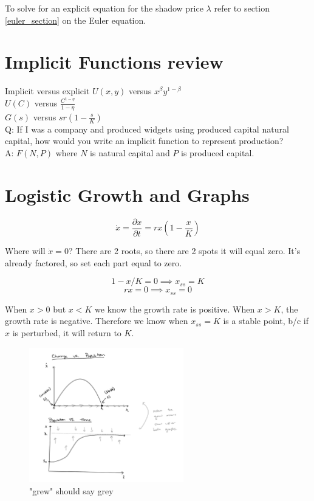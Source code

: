 \documentclass[12pt]{article}
\begin{document}
To solve for an explicit equation for the shadow price $\lambda$ refer to section \ref{euler_section} on the Euler equation.

\section{Implicit Functions review}
Implicit versus explicit 
$U(x,y)$ versus $x^{\beta}y^{1-\beta}$\\
$U(C)$ versus $\frac{C^{1 - \eta}}{1 - \eta}$\\
$G(s)$ versus $sr(1 - \frac{s}{K})$\\

Q: If I was a company and produced widgets using produced capital natural capital, how would you write an implicit function to represent production? \\
A: $F(N, P)$ where $N$ is natural capital and $P$ is produced capital. 

\section{Logistic Growth and Graphs}
$$ \dot x = \frac{\partial x}{\partial t} = rx(1 - \frac{x}{K})$$

Where will $\dot x = 0$? There are 2 roots, so there are 2 spots it will equal zero. It's already factored, so set each part equal to zero. 

$$ 1 - x/K = 0 \implies x_{ss} = K$$
$$ rx = 0 \implies x_{ss} = 0$$

When $x > 0$ but $ x < K$ we know the growth rate is positive. When $x > K$, the growth rate is negative. Therefore we know when $x_{ss} = K$ is a stable point, b/c if $x$ is perturbed, it will return to $K$. 

\begin{figure}[h]
    \centering
    \includegraphics[width=0.6\textwidth]{logistic_growth.png}
    \caption{"grew" should say grey}
    \label{fig:my_label}
\end{figure}
\end{document}
